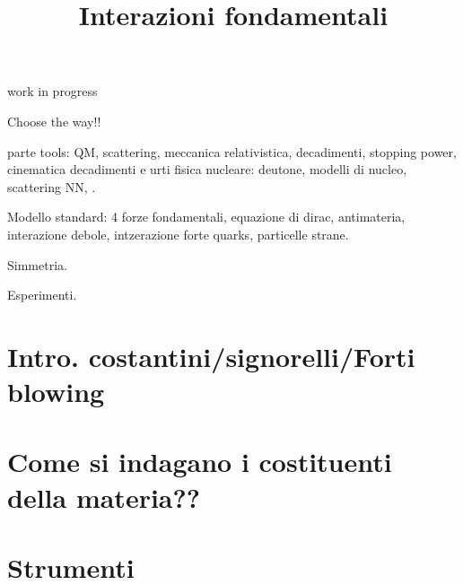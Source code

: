 \documentclass[10pt,xcolor={usenames},fleqn,mathserif,serif]{beamer}
\title{Interazioni fondamentali}
\begin{document}

\begin{frame}{work in progress}

Choose the way!!

    parte tools: QM, scattering, meccanica relativistica, decadimenti, stopping power, cinematica decadimenti e urti
    fisica nucleare: deutone, modelli di nucleo, scattering NN, .
    
    Modello standard: 4 forze fondamentali,  equazione di dirac, antimateria, interazione debole, intzerazione forte quarks, particelle strane.
    
    Simmetria.
    
    Esperimenti.
    
\end{frame}

\begin{frame}
  \titlepage
  \tableofcontents[onlyparts]

\end{frame}


\part{Intro. costantini/signorelli/Forti blowing}


\part{Come si indagano i costituenti della materia??}


\part{Strumenti}\label{tools}

\end{document}
